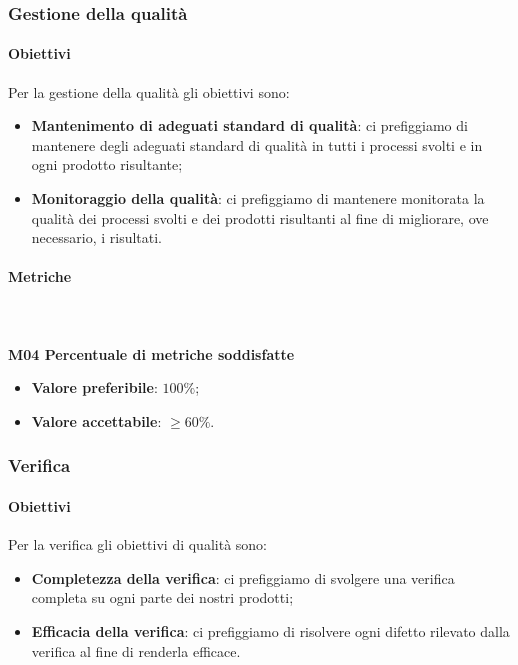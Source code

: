 		\subsubsection{Gestione della qualità}
			\paragraph{Obiettivi}
			Per la gestione della qualità gli obiettivi sono:
			\begin{itemize}
				\item \textbf{Mantenimento di adeguati standard di qualità}: ci prefiggiamo di mantenere degli adeguati standard di qualità in tutti i processi svolti e in ogni prodotto risultante;
				\item \textbf{Monitoraggio della qualità}: ci prefiggiamo di mantenere monitorata la qualità dei processi svolti e dei prodotti risultanti al fine di migliorare, ove necessario, i risultati.
			\end{itemize}	 
			\paragraph{Metriche} \mbox{} \\ \\
				\textbf{M04 Percentuale di metriche soddisfatte}
				\begin{itemize}
					\item \textbf{Valore preferibile}: $100\%$;
					\item \textbf{Valore accettabile}: $\ge 60\%$.
				\end{itemize}
		\subsubsection{Verifica}
			\paragraph{Obiettivi}
			Per la verifica gli obiettivi di qualità sono:
			\begin{itemize}
				\item \textbf{Completezza della verifica}: ci prefiggiamo di svolgere una verifica completa su ogni parte dei nostri prodotti;
				\item \textbf{Efficacia della verifica}: ci prefiggiamo di risolvere ogni difetto rilevato dalla verifica al fine di renderla efficace.
			\end{itemize}
